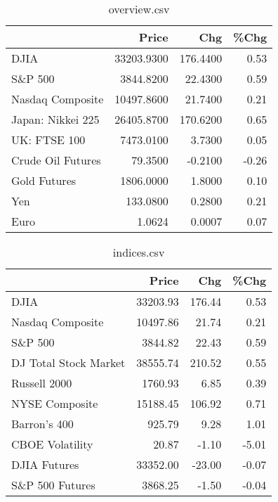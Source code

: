 \documentclass{article}%
\begin{document}
\begin{table}[htbp]%
\caption{overview.csv}%
\centering%
\begin{adjustbox}{width=1\textwidth}%
\begin{tabular}{lrrr}
\toprule
                  &      Price &      Chg &  \%Chg \\
\midrule
             DJIA & 33203.9300 & 176.4400 &  0.53 \\
          S\&P 500 &  3844.8200 &  22.4300 &  0.59 \\
 Nasdaq Composite & 10497.8600 &  21.7400 &  0.21 \\
Japan: Nikkei 225 & 26405.8700 & 170.6200 &  0.65 \\
     UK: FTSE 100 &  7473.0100 &   3.7300 &  0.05 \\
Crude Oil Futures &    79.3500 &  -0.2100 & -0.26 \\
     Gold Futures &  1806.0000 &   1.8000 &  0.10 \\
              Yen &   133.0800 &   0.2800 &  0.21 \\
             Euro &     1.0624 &   0.0007 &  0.07 \\
\bottomrule
\end{tabular}
%
\end{adjustbox}%
\end{table}

%


\begin{table}[htbp]%
\caption{indices.csv}%
\centering%
\begin{adjustbox}{width=1\textwidth}%
\begin{tabular}{lrrr}
\toprule
                      &    Price &    Chg &  \%Chg \\
\midrule
                 DJIA & 33203.93 & 176.44 &  0.53 \\
     Nasdaq Composite & 10497.86 &  21.74 &  0.21 \\
              S\&P 500 &  3844.82 &  22.43 &  0.59 \\
DJ Total Stock Market & 38555.74 & 210.52 &  0.55 \\
         Russell 2000 &  1760.93 &   6.85 &  0.39 \\
       NYSE Composite & 15188.45 & 106.92 &  0.71 \\
         Barron's 400 &   925.79 &   9.28 &  1.01 \\
      CBOE Volatility &    20.87 &  -1.10 & -5.01 \\
         DJIA Futures & 33352.00 & -23.00 & -0.07 \\
      S\&P 500 Futures &  3868.25 &  -1.50 & -0.04 \\
\bottomrule
\end{tabular}
%
\end{adjustbox}%
\end{table}
\end{document}
